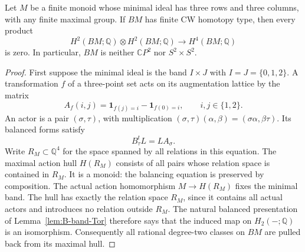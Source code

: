 \begin{theorem}
\label{B:three-by-three-cups}
Let $M$ be a finite monoid whose minimal ideal has three rows and
three columns, with any finite maximal group.  If $BM$ has finite
CW homotopy type, then every product
\[
 H^2(BM;\mathbb Q)\otimes H^2(BM;\mathbb Q)
       \longrightarrow H^4(BM;\mathbb Q)
\]
is zero.  In particular, $BM$ is neither $\mathbb CP^2$ nor
$S^2\times S^2$.
\end{theorem}
\begin{proof}
First suppose the minimal ideal is the band $I\times J$ with
$I=J=\{0,1,2\}$.  A transformation $f$ of a three-point set acts
on its augmentation lattice by the matrix
\[
 A_f(i,j)=\mathbf1_{f(j)=i}-\mathbf1_{f(0)=i},
 \qquad i,j\in\{1,2\}.
\]
An actor is a pair $(\sigma,\tau)$, with multiplication
$(\sigma,\tau)(\alpha,\beta)=(\sigma\alpha,\beta\tau)$.
Its balanced forms satisfy
\begin{equation}\label{B:3x3-balance}
 B_\tau^tL=LA_\sigma.
\end{equation}
Write $R_M\subset\mathbb Q^4$ for the space spanned by all
relations in this equation.  The maximal action hull $H(R_M)$ consists
of all pairs whose relation space is contained in $R_M$.
It is a monoid: the balancing equation is preserved by composition.
The actual action homomorphism $M\to H(R_M)$ fixes the minimal band.
The hull has exactly the relation space $R_M$, since it contains
all actual actors and introduces no relation outside $R_M$.
The natural balanced presentation of Lemma~\ref{lem:B-band-Tor}
therefore says that the induced map on $H_2(-;\mathbb Q)$ is an
isomorphism.  Consequently all rational degree-two classes on $BM$
are pulled back from its maximal hull.


\end{proof}
